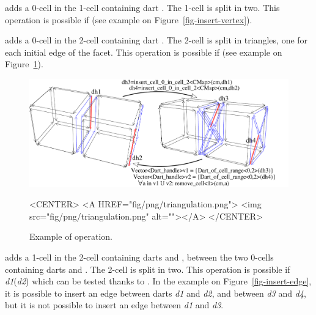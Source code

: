  adds a 0-cell in
the 1-cell containing dart . The 1-cell is split in two. This
operation is possible if \myin{} (see
example on Figure~\ref{fig-insert-vertex}).

 adds a 0-cell in
the 2-cell containing dart . The 2-cell is split in
triangles, one for each initial edge of the facet. This operation
is possible if \myin{} (see example on
Figure~\ref{fig-triangulate}).

\begin{figure}[htb]
  \begin{ccTexOnly}
    \centerline{\includegraphics[width=.85\textwidth]
      {Combinatorial_map/fig/pdf/triangulation}}
  \end{ccTexOnly}
  \begin{ccHtmlOnly}
    <CENTER> <A HREF="fig/png/triangulation.png"> <img
    src="fig/png/triangulation.png" alt=""></A> </CENTER>
  \end{ccHtmlOnly}
  \caption{Example of  operation.}
  \label{fig-triangulate}
\end{figure}

 adds a 1-cell in
the 2-cell containing darts  and , between the two
0-cells containing darts  and . The 2-cell is split
in two. This operation is possible if \emph{d1}\myin{}\orbit{\betaun{}}(\emph{d2})
which can be tested thanks to
.  In the example on
Figure~\ref{fig-insert-edge}, it is possible to insert an edge
between darts \emph{d1} and \emph{d2}, and between \emph{d3} and \emph{d4}, but it is
not possible to insert an edge between \emph{d1} and \emph{d3}.

